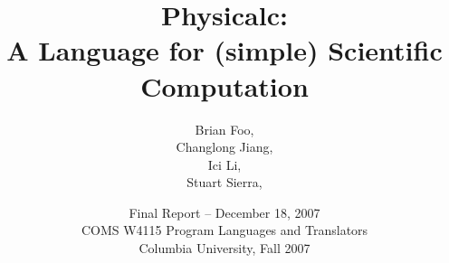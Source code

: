 \documentclass{report}
\begin{document}
\title{Physicalc:\\
A Language for (simple) Scientific Computation}

\date{Final Report -- December 18, 2007\\
COMS W4115 Program Languages and Translators \\
Columbia University, Fall 2007}

\author{Brian Foo, \\
Changlong Jiang, \\
Ici Li, \\
Stuart Sierra, }

\maketitle

\tableofcontents


















\end{document}
